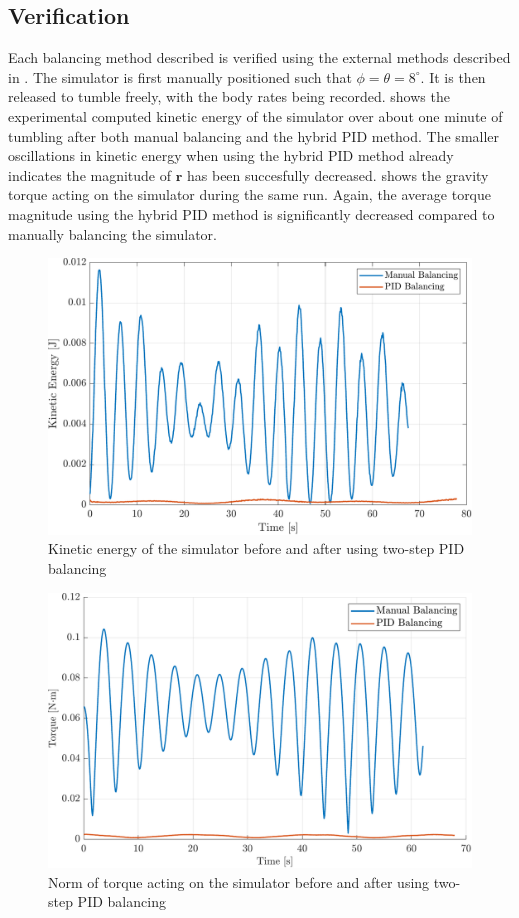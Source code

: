 \subsection{Verification}

Each balancing method described is verified using the external methods described in . The simulator is first manually positioned such that $\phi=\theta=8^{\circ}$. It is then released to tumble freely, with the body rates being recorded.  shows the experimental computed kinetic energy of the simulator over about one minute of tumbling after both manual balancing and the hybrid PID method. The smaller oscillations in kinetic energy when using the hybrid PID method already indicates the magnitude of $\bm{r}$ has been succesfully decreased.  shows the gravity torque acting on the simulator during the same run. Again, the average torque magnitude using the hybrid PID method is significantly decreased compared to manually balancing the simulator. 

\begin{figure}[p]
    \centering
    \includegraphics[width=0.85\linewidth]{plots/hardware_verification_KE.pdf}
    \caption{Kinetic energy of the simulator before and after using two-step PID balancing}
    \label{fig:KE_post}
\end{figure}

\begin{figure}[p]
    \centering
    \includegraphics[width=0.85\linewidth]{plots/hardware_verification_torque.pdf}
    \caption{Norm of torque acting on the simulator before and after using two-step PID balancing}
    \label{fig:torque_post}
\end{figure}

